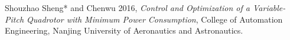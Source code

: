 \section *  {}

\begin{thebibliography}{9}


Shouzhao Sheng* and Chenwu 2016,      %
\textit{Control and Optimization of a Variable-Pitch
Quadrotor with Minimum Power Consumption},   %
College of Automation Engineering, Nanjing University of Aeronautics and Astronautics.
        


\end{thebibliography}




